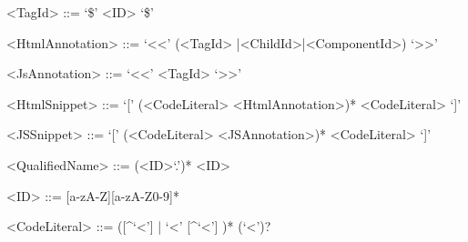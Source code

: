 \documentclass{article}
\begin{document}
{\begin{grammar}
<TagId> ::= `\$' <ID> `\$' 

<HtmlAnnotation> ::= `<<' (<TagId> |<ChildId>|<ComponentId>) `>>'

<JsAnnotation> ::= `<<' <TagId> `>>'

<HtmlSnippet> ::= `[' (<CodeLiteral> <HtmlAnnotation>)*  <CodeLiteral> `]'

<JSSnippet> ::= `[' (<CodeLiteral> <JSAnnotation>)*  <CodeLiteral> `]'

<QualifiedName> ::= (<ID>`.')* <ID>

<ID> ::= [a-zA-Z][a-zA-Z0-9]*

<CodeLiteral> ::= ([\^{}`<'] | `<' [\^{}`<'] )* (`<')?


\end{grammar}
\newpage
}
\end{document}
